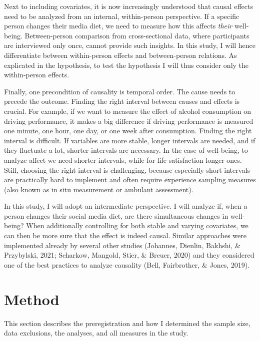 \documentclass[
  english,
  man,mask,floatsintext]{apa6}
\begin{document}
Next to including covariates, it is now increasingly understood that causal effects need to be analyzed from an internal, within-person perspective.
If a specific person changes their media diet, we need to measure how this affects \emph{their} well-being.
Between-person comparison from cross-sectional data, where participants are interviewed only once, cannot provide such insights.
In this study, I will hence differentiate between within-person effects and between-person relations.
As explicated in the hypothesis, to test the hypothesis I will thus consider only the within-person effects.

Finally, one precondition of causality is temporal order.
The cause needs to precede the outcome.
Finding the right interval between causes and effects is crucial.
For example, if we want to measure the effect of alcohol consumption on driving performance, it makes a big difference if driving performance is measured one minute, one hour, one day, or one week after consumption.
Finding the right interval is difficult.
If variables are more stable, longer intervals are needed, and if they fluctuate a lot, shorter intervals are necessary.
In the case of well-being, to analyze affect we need shorter intervals, while for life satisfaction longer ones.
Still, choosing the right interval is challenging, because especially short intervals are practically hard to implement and often require experience sampling measures (also known as in situ measurement or ambulant assessment).

In this study, I will adopt an intermediate perspective.
I will analyze if, when a person changes their social media diet, are there simultaneous changes in well-being?
When additionally controlling for both stable and varying covariates, we can then be more sure that the effect is indeed causal.
Similar approaches were implemented already by several other studies (Johannes, Dienlin, Bakhshi, \& Przybylski, 2021; Scharkow, Mangold, Stier, \& Breuer, 2020) and they considered one of the best practices to analyze causality (Bell, Fairbrother, \& Jones, 2019).

\hypertarget{method}{%
\section{Method}\label{method}}

This section describes the preregistration and how I determined the sample size, data exclusions, the analyses, and all measures in the study.
\end{document}
